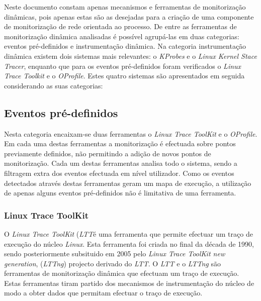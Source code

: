 Neste documento constam apenas mecanismos e ferramentas de monitorização dinâmicas, pois apenas estas são as desejadas para a criação de uma componente de monitorização de rede orientada ao processo.
De entre as ferramentas de monitorização dinâmica analisadas é possível agrupá-las em duas categorias: eventos pré-definidos e instrumentação dinâmica.
Na categoria instrumentação dinâmica existem dois sistemas mais relevantes: o \textit{KProbes} e o \textit{Linux Kernel Stace Tracer}, enquanto que para os eventos pré-definidos foram verificados o \textit{Linux Trace Toolkit} e o \textit{OProfile}.
Estes quatro sistemas são apresentados em seguida considerando as suas categorias:

\subsection{Eventos pré-definidos}

Nesta categoria encaixam-se duas ferramentas o \textit{Linux Trace ToolKit} e o \textit{OProfile}.
Em cada uma destas ferramentas a monitorização é efectuada sobre pontos previamente definidos, não permitindo a adição de novos pontos de monitorização.
Cada um destas ferramentas analisa todo o sistema, sendo a filtragem extra dos eventos efectuada em nível utilizador.
Como os eventos detectados através destas ferramentas geram um mapa de execução, a utilização de apenas alguns eventos pré-definidos não é limitativa de uma ferramenta.

\subsubsection{Linux Trace ToolKit}\label{cap:linux_trace_toolkit_overview}


O \textit{Linux Trace ToolKit} (\textit{LTT}é uma ferramenta que permite efectuar um traço de execução do núcleo \textit{Linux}.
Esta ferramenta foi criada no final da década de 1990, sendo posteriormente subsituido em 2005 pelo \textit{Linux Trace ToolKit new generation}, (\textit{LTTng}) projecto derivado do \textit{LTT}.
O \textit{LTT} e o \textit{LTTng} são ferramentas de monitorização dinâmica que efectuam um traço de execução.
Estas ferramentas tiram partido dos mecanismos de instrumentação do núcleo de modo a obter dados que permitam efectuar o traço de execução.

